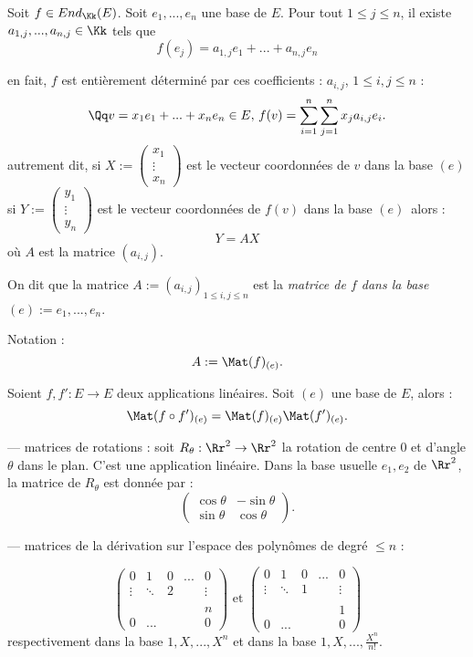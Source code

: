 \documentclass[class=report,crop=false]{standalone}
\newcommand{\End}{End}
\begin{document}
Soit $f \in \End_\Kk(E)$. Soit $e_1,...,e_n$ une base de $E$. Pour tout $1 \le j \le n$, il existe $a_{1,j},...,a_{n,j} \in \Kk$ tels que 
\[f(e_j) = a_{1,j}e_1 + ...+ a_{n,j}e_n\]

en fait, $f$ est entièrement déterminé par ces coefficients : $a_{i,j}$, $ 1 \le i,j \le n$ :
\[\Qq v = x_1e_1+...+x_n e_n\in E,\, f(v) = \sum_{i=1}^n\sum_{j=1}^n x_ja_{i,j}e_i .\]
 autrement dit, si $X:=\left(\begin{array}{c}
x_1\\
\vdots\\
x_n
\end{array}\right)$ est le vecteur \og coordonnées de $v$ dans la base $(e)$\fg\, si $Y:=\left(\begin{array}{c}
y_1\\
\vdots\\
y_n
\end{array}\right)$ est le vecteur \og coordonnées de $f(v)$ dans la base $(e)$\fg\ alors : 
\[Y = AX\]
où $A$ est la matrice $(a_{i,j})$.

On dit que la matrice $A := (a_{i,j})_{1 \le i,j\le n}$ est la {\it matrice de $f$ dans la base $(e) := e_1,...,e_n$}.

Notation : \[A:= \Mat(f)_{(e)} .\]

\begin{exercicecours}
 Soient $f,f' : E \to E $ deux applications linéaires. Soit $(e)$ une base de $E$, alors :
\[ \Mat (f \circ f')_{(e)} = \Mat (f)_{(e)} \Mat (f')_{(e)} . \]
\end{exercicecours}

\begin{exemple}

--- matrices de rotations : soit $R_\theta : \Rr^2 \to \Rr^2$ la rotation de centre $0$ et d'angle $\theta$ dans le plan. C'est une application linéaire. Dans la base usuelle $e_1,e_2$ de $\Rr^2$, la matrice de $R_\theta$ est donnée par :
\[\left(\begin{array}{cc}
\cos \theta & -\sin \theta \\
\sin \theta & \cos \theta
\end{array}\right).\]

--- matrices de la dérivation sur l'espace des polynômes de degré $\le n$ :

\[\left(\begin{array}{ccccc}
0 & 1 &0 &...&0\\
\vdots &\ddots & 2&&\vdots \\
&&&&\\
&&&&n\\
0 & ...&&&0
\end{array}\right) \text{ et } \left(\begin{array}{ccccc}
0 & 1 &0 &...&0\\
\vdots &\ddots & 1&&\vdots \\
&&&&\\
&&&&1\\
0 & ...&&&0
\end{array}\right)\]
respectivement dans la base $1,X,...,X^n$ et dans la base $1,X,...,\frac{X^n}{n!}$.
\end{exemple}
\end{document}
